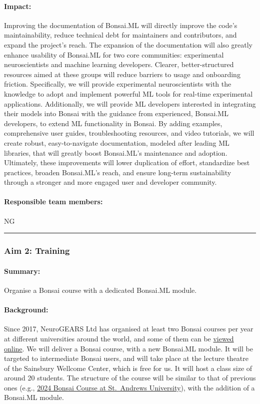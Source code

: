 \paragraph{Impact:} Improving the documentation of Bonsai.ML will directly
improve the code's maintainability, reduce technical debt for maintainers and
contributors, and expand the project's reach. The expansion of the
documentation will also greatly enhance usability of Bonsai.ML for two core
communities: experimental neuroscientists and machine learning developers.
Clearer, better-structured resources aimed at these groups will reduce barriers
to usage and onboarding friction. Specifically, we will provide experimental
neuroscientists with the knowledge to adopt and implement powerful ML tools for
real-time experimental applications. Additionally, we will provide ML
developers interested in integrating their models into Bonsai with the guidance
from experienced, Bonsai.ML developers, to extend ML functionality in Bonsai.
By adding examples, comprehensive user guides, troubleshooting resources, and
video tutorials, we will create robust, easy-to-navigate documentation, modeled
after leading ML libraries, that will greatly boost Bonsai.ML's maintenance and
adoption. Ultimately, these improvements will lower duplication of effort,
standardize best practices, broaden Bonsai.ML's reach, and ensure long-term
sustainability through a stronger and more engaged user and developer
community.

\paragraph{Responsible team members:} NG

\noindent\rule{\textwidth}{1pt}
\subsubsection{Aim 2: Training}
\paragraph{Summary:} Organise a Bonsai course with a dedicated Bonsai.ML module.

\paragraph{Background:} Since 2017, NeuroGEARS Ltd has organised at least two
Bonsai courses per year at different universities around the world, and some of
them can be \href{https://bonsai-rx.org/learn/}{viewed online}.
%
We will deliver a Bonsai course, with a new Bonsai.ML module. It will be
targeted to intermediate Bonsai users, and will take place at the lecture
theatre of the Sainsbury Wellcome Center, which is free for us. It will host a
class size of around 20 students. The structure of the course will be similar
to that of previous ones (e.g.,
\href{https://neurogears.org/st-andrews-2024/}{2024 Bonsai Course at
St.~Andrews University}), with the addition of a Bonsai.ML module.

